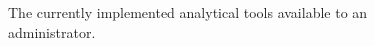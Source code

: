 \begin{figure}[h!]
	\centering
	\caption{The currently implemented analytical tools available to an administrator.}
	\label{fig:screens-analytics-list}
\end{figure}


